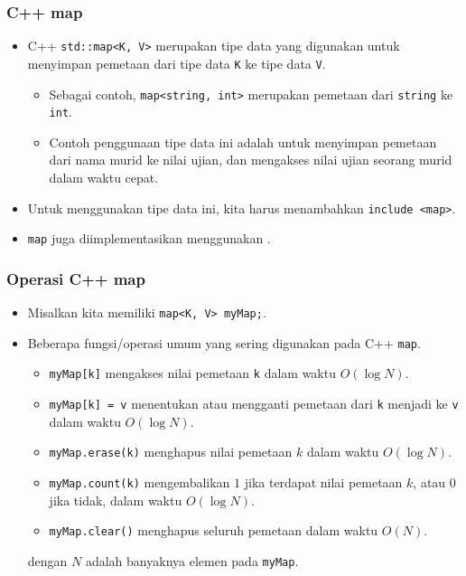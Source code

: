 \begin{frame}
\frametitle{C++ map}
\begin{itemize}
  \item C++ \lstinline{std::map<K, V>} merupakan tipe data yang digunakan untuk menyimpan pemetaan dari tipe data \lstinline{K} ke tipe data \lstinline{V}.
  \begin{itemize}
    \item Sebagai contoh, \lstinline{map<string, int>} merupakan pemetaan dari \lstinline{string} ke \lstinline{int}.
    \item Contoh penggunaan tipe data ini adalah untuk menyimpan pemetaan dari nama murid ke nilai ujian, dan mengakses nilai ujian seorang murid dalam waktu cepat.
  \end{itemize}
  \item Untuk menggunakan tipe data ini, kita harus menambahkan \lstinline{include <map>}.
  \item \lstinline{map} juga diimplementasikan menggunakan \xspace.
\end{itemize}
\end{frame}

\begin{frame}
\frametitle{Operasi C++ map}
\begin{itemize}
  \item Misalkan kita memiliki \lstinline{map<K, V> myMap;}.
  \item Beberapa fungsi/operasi umum yang sering digunakan pada C++ \lstinline{map}.
  \begin{itemize}
    \item \lstinline{myMap[k]} mengakses nilai pemetaan \lstinline{k} dalam waktu $O(\log N)$.
    \item \lstinline{myMap[k] = v} menentukan atau mengganti pemetaan dari \lstinline{k} menjadi ke \lstinline{v} dalam waktu $O(\log N)$.
    \item \lstinline{myMap.erase(k)} menghapus nilai pemetaan $k$ dalam waktu $O(\log N)$.
    \item \lstinline{myMap.count(k)} mengembalikan $1$ jika terdapat nilai pemetaan $k$, atau $0$ jika tidak, dalam waktu $O(\log N)$.
    \item \lstinline{myMap.clear()} menghapus seluruh pemetaan dalam waktu $O(N)$.
  \end{itemize}
  dengan $N$ adalah banyaknya elemen pada \lstinline{myMap}.
\end{itemize}
\end{frame}

